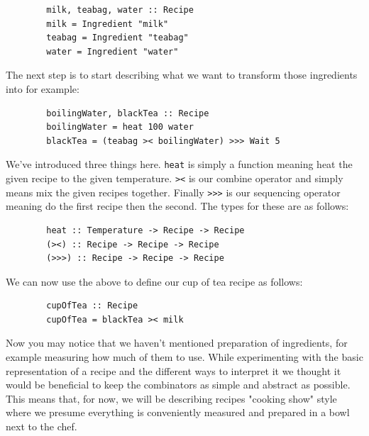 \documentclass[11pt]{article}
\begin{document}
    \begin{tt}
    \small
    \begin{lstlisting}
        milk, teabag, water :: Recipe
        milk = Ingredient "milk"
        teabag = Ingredient "teabag"
        water = Ingredient "water"
    \end{lstlisting}
    \end{tt}

    The next step is to start describing what we want to transform
    those ingredients into for example:

    \begin{tt}
    \small
    \begin{lstlisting}
        boilingWater, blackTea :: Recipe
        boilingWater = heat 100 water
        blackTea = (teabag >< boilingWater) >>> Wait 5
    \end{lstlisting}
    \end{tt}

    We've introduced three things here. \texttt{heat} is simply
    a function meaning heat the given recipe to the given temperature.
    \texttt{><} is our combine operator and simply means mix the
    given recipes together. Finally \texttt{>>>} is our sequencing
    operator meaning do the first recipe then the second. The types
    for these are as follows: 
    
    \begin{tt}
    \small
    \begin{lstlisting}
        heat :: Temperature -> Recipe -> Recipe
        (><) :: Recipe -> Recipe -> Recipe
        (>>>) :: Recipe -> Recipe -> Recipe
    \end{lstlisting}
    \end{tt}

    We can now use the above to define our cup of tea recipe as follows:

    \begin{tt}
    \small
    \begin{lstlisting}
        cupOfTea :: Recipe
        cupOfTea = blackTea >< milk
    \end{lstlisting}
    \end{tt}

    Now you may notice that we haven't mentioned preparation of ingredients,
    for example measuring how much of them to use. While experimenting with
    the basic representation of a recipe and the different ways to interpret
    it we thought it would be beneficial to keep the combinators as simple
    and abstract as possible. This means that, for now, we will be describing
    recipes "cooking show" style where we presume everything is conveniently
    measured and prepared in a bowl next to the chef.
\end{document}
